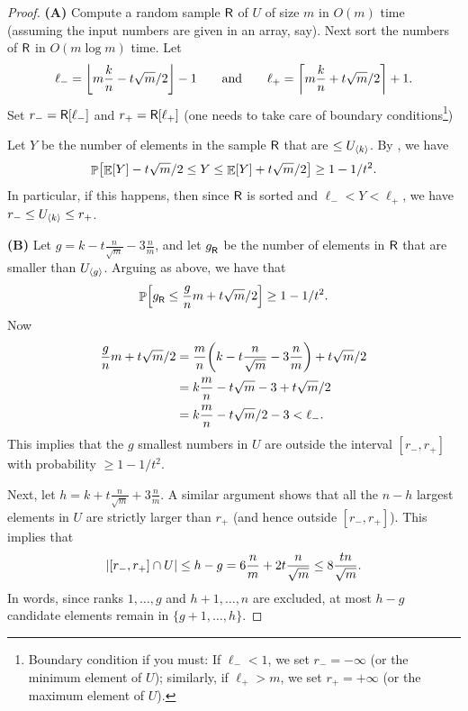 \begin{proof}
    \textbf{(A)} Compute a random sample $\mathsf{R}$ of $U$ of size $m$
    in $O(m)$ time (assuming the input numbers are given in an array,
    say). Next sort the numbers of $\mathsf{R}$ in $O( m \log m)$
    time. Let
    \begin{equation*}
        \ell_{-} = \floor{m \frac{k}{n} - t \sqrt{m}/2 }-1
        \qquad \text{and} \qquad%
        \ell_{+} = \ceil{m \frac{k}{n} + t \sqrt{m}/2 }+1.
    \end{equation*}
    Set $r_{-} = \mathsf{R}[ \ell_{-}]$ and $r_+ = \mathsf{R}[ \ell_{+}]$ (one needs
    to take care of boundary conditions\footnote{Boundary condition if
       you must: If $\ell_- < 1$, we set $r_- = -\infty$ (or the minimum
       element of $U$); similarly, if $\ell_+ > m$, we set
       $r_+ = +\infty$ (or the maximum element of $U$).})

    Let $Y$ be the number of elements in the sample $\mathsf{R}$ that are
    $\leq U_{\langle k\rangle}$.  By , we have
    \begin{equation*}
        \ds%
        \Prob{ \Ex{Y} - t \sqrt{m}/2 \leq Y \leq \Ex{Y} + t \sqrt{m}/2
        } \geq 1- {1}/{t^2}.
    \end{equation*}
    In particular, if this happens, then since $\mathsf{R}$ is sorted and
    $\ell_- < Y < \ell_+$, we have $r_- \leq U_{\langle k\rangle} \leq r_+$. %

    \bigskip%
    \noindent
    \textbf{(B)} Let $g= k - t \frac{n}{\sqrt{m}} -3\frac{n}{m}$, and
    let $g^{}_{\mathsf{R}}$ be the number of elements in $\mathsf{R}$ that are
    smaller than $U_{\langle g\rangle}$. Arguing as above, we have that
    \begin{equation*}
        \Prob{ g^{}_\Sample \leq \frac{g}{n} m + t \sqrt{m}/2 } \geq
        1- {1}/{t^2}.
    \end{equation*}
    Now
    \begin{align*}
      \frac{g}{n} m + t \sqrt{m}/2 %
      &=
      \frac{m}{n}\pth{
      k - t \frac{n}{\sqrt{m}} -3\frac{n}{m} }  +  t \sqrt{m}/2
      \\&=
      k \frac{m}{n} - t \sqrt{m}  -3 +  t \sqrt{m}/2
      \\&=
      k \frac{m}{n} - t \sqrt{m}/2  -3
      < \ell_{-}.
    \end{align*}
    This implies that the $g$ smallest numbers in $U$ are outside the
    interval $[r_-,r_+]$ with probability $\geq 1-1/t^2$.

    Next, let $h= k + t \frac{n}{\sqrt{m}} +3\frac{n}{m}$. A similar
    argument shows that all the $n-h$ largest elements in $U$ are
    strictly larger than $r_+$ (and hence outside $[r_-, r_+]$).  This
    implies that
    \begin{equation*}
      \cardin{[r_-, r_+] \cap U} \leq h-g = 6 \frac{n}{m} + 2t
      \frac{n}{\sqrt{m}}%
      \leq%
      8 \frac{tn}{\sqrt{m}}.
  \end{equation*}
  In words, since ranks $1,\dots,g$ and $h+1,\dots,n$ are excluded, at
  most $h-g$ candidate elements remain in $\{g+1,\dots,h\}$.
\end{proof}

